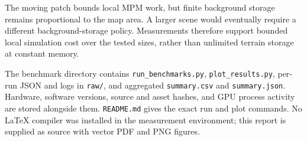 \documentclass[10pt,a4paper]{article}
\begin{document}
The moving patch bounds local MPM work, but finite background storage remains proportional to the map area. A larger scene would eventually require a different background-storage policy. Measurements therefore support bounded local simulation cost over the tested sizes, rather than unlimited terrain storage at constant memory.

The benchmark directory contains \texttt{run\_benchmarks.py}, \texttt{plot\_results.py}, per-run JSON and logs in \texttt{raw/}, and aggregated \texttt{summary.csv} and \texttt{summary.json}. Hardware, software versions, source and asset hashes, and GPU process activity are stored alongside them. \texttt{README.md} gives the exact run and plot commands. No LaTeX compiler was installed in the measurement environment; this report is supplied as source with vector PDF and PNG figures.
\end{document}
